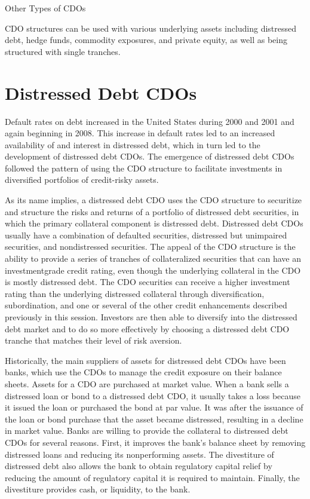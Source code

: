 \documentclass[11pt]{article}
\begin{document}
Other Types of CDOs

CDO structures can be used with various underlying assets including distressed debt, hedge funds, commodity exposures, and private equity, as well as being structured with single tranches.

\section*{Distressed Debt CDOs}
Default rates on debt increased in the United States during 2000 and 2001 and again beginning in 2008. This increase in default rates led to an increased availability of and interest in distressed debt, which in turn led to the development of distressed debt CDOs. The emergence of distressed debt CDOs followed the pattern of using the CDO structure to facilitate investments in diversified portfolios of credit-risky assets.

As its name implies, a distressed debt CDO uses the CDO structure to securitize and structure the risks and returns of a portfolio of distressed debt securities, in which the primary collateral component is distressed debt. Distressed debt CDOs usually have a combination of defaulted securities, distressed but unimpaired securities, and nondistressed securities. The appeal of the CDO structure is the ability to provide a series of tranches of collateralized securities that can have an investmentgrade credit rating, even though the underlying collateral in the CDO is mostly distressed debt. The CDO securities can receive a higher investment rating than the underlying distressed collateral through diversification, subordination, and one or several of the other credit enhancements described previously in this session. Investors are then able to diversify into the distressed debt market and to do so more effectively by choosing a distressed debt CDO tranche that matches their level of risk aversion.

Historically, the main suppliers of assets for distressed debt CDOs have been banks, which use the CDOs to manage the credit exposure on their balance sheets. Assets for a CDO are purchased at market value. When a bank sells a distressed loan or bond to a distressed debt CDO, it usually takes a loss because it issued the loan or purchased the bond at par value. It was after the issuance of the loan or bond purchase that the asset became distressed, resulting in a decline in market value. Banks are willing to provide the collateral to distressed debt CDOs for several reasons. First, it improves the bank's balance sheet by removing distressed loans and reducing its nonperforming assets. The divestiture of distressed debt also allows the bank to obtain regulatory capital relief by reducing the amount of regulatory capital it is required to maintain. Finally, the divestiture provides cash, or liquidity, to the bank.
\end{document}

